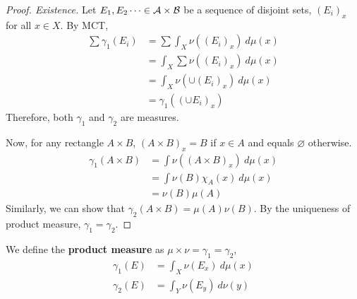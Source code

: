 \documentclass[11pt]{article}
\newcommand{\dmu}[0]{\ d\mu}
\begin{document}
\begin{theorem}
\begin{proof}[Proof. Existence]
			Let $E_1, E_2 \dots \in \mathcal{{A}} \times \mathcal{{B}}$ be a sequence of disjoint sets, $(E_i)_x$ for all $x \in X$.
			By MCT,
			\begin{align}
				\sum \gamma_1(E_i) &= \sum \int_X \nu((E_i)_x)\dmu(x) \\
				&= \int_X \sum \nu((E_i)_x)\dmu(x) \\
				&= \int_X \nu (\cup (E_i)_x)\dmu(x) \\
				&= \gamma_1((\cup E_i)_x)
			\end{align}
			Therefore, both $\gamma_1$ and $\gamma_2$ are measures.
			
			Now, for any rectangle $A \times B$, $(A \times B)_x = B$ if $x \in A$ and equals $\varnothing$ otherwise.
			\begin{align}
				\gamma_1(A \times B) &= \int \nu((A \times B)_x)\dmu(x) \\
				&= \int \nu(B) \chi_A(x)\dmu(x) \\
				&= \nu(B) \mu(A)
			\end{align}
			Similarly, we can show that $\gamma_2(A\times B) = \mu(A) \nu(B)$.
			By the uniqueness of product measure, $\gamma_1 = \gamma_2$.
		\end{proof}
	\end{theorem}
	\begin{definition}
		We define the \textbf{product measure} as $\mu \times \nu = \gamma_1 = \gamma_2$,
		\begin{align}
			\gamma_1(E) &= \int_X \nu(E_x)\dmu(x) \\
			\gamma_2(E) &= \int_Y \nu(E_y)\ d\nu(y)
		\end{align}
	\end{definition}
	
\end{document}
